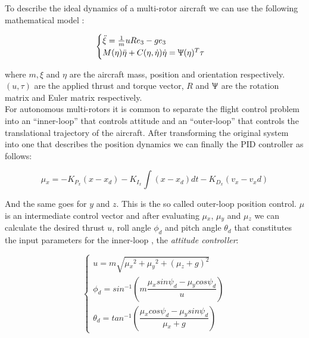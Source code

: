 To describe the ideal dynamics of a multi-rotor aircraft we can use the following mathematical model \cite{2010JSDD4255A}:

\begin{equation}
  \begin{cases}
   \ddot{\xi} = \frac{1}{m}uR{e_3}-g{e_3} \\
   M(\eta)\ddot{\eta}+C(\eta,\dot{\eta})\dot{\eta} = \Uppsi(\eta)^{T}\tau
  \end{cases}
\end{equation}

where $m,\xi$ and $\eta$ are the aircraft mass, position and orientation respectively. $(u, \tau)$ are the applied thrust and torque vector, $R$ and $\Uppsi$ are the rotation matrix and Euler matrix respectively. \\%
For autonomous multi-rotors it is common to separate the flight control problem into an ``inner-loop'' that controls attitude and an ``outer-loop'' that controls the translational trajectory of the aircraft. After transforming the original system into one that describes the position dynamics \cite{kendoul:hal-00338358} we can finally the PID controller as follows:

\begin{equation}
\mu{_x} = - K_{P_x}(x - x_d) - K_{I_x} \int (x - x_d) dt - K_{D_x}(v_x-v_{x}d)
\end{equation}

And the same goes for $y$ and $z$. This is the so called outer-loop position control. $\mu$ is an intermediate control vector and after evaluating $\mu{_x}$, $\mu{_y}$ and $\mu{_z}$ we can calculate the desired thrust $u$, roll angle $\phi_d$ and pitch angle $\theta_d$ that  constitutes the input parameters for the inner-loop , the \emph{attitude controller}:

\begin{equation}
  \begin{cases}
   u = m \sqrt{{\mu{_x}}^2 + {\mu{_y}}^2 + {(\mu{_z}+g)}^2} \\
  \phi_d = sin^{-1} \left( m\dfrac{ \mu{_x} sin\psi_d - \mu{_y} cos\psi_d }{ u } \right) \\
  \theta_d = tan^{-1} \left( \dfrac{ \mu{_x} cos\psi_d - \mu{_y} sin\psi_d }{ \mu{_x} + g} \right)
  \end{cases}
\end{equation}

